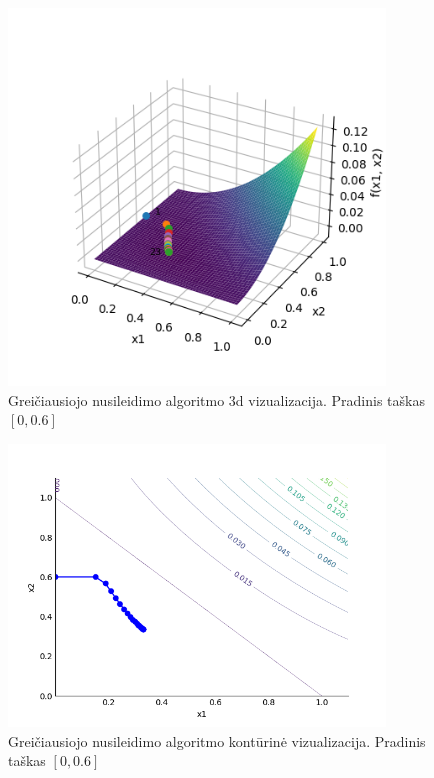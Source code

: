 \documentclass{VUMIFPSkursinis}
\begin{document}
\begin{figure}[H]
  \centering
  \includegraphics[width=10cm]{img/steepest_descent_3d_[0.0,0.6].png}
  \caption{Greičiausiojo nusileidimo algoritmo 3d vizualizacija. Pradinis taškas $[0, 0.6]$}
  \label{img:steep-des-3d-69}
\end{figure}

\begin{figure}[H]
  \centering
  \includegraphics[width=10cm]{img/steepest_descent_contour_[0.0,0.6].png}
  \caption{Greičiausiojo nusileidimo algoritmo kontūrinė vizualizacija. Pradinis taškas $[0, 0.6]$}
  \label{img:steep-des-co-69}
\end{figure}
\end{document}
